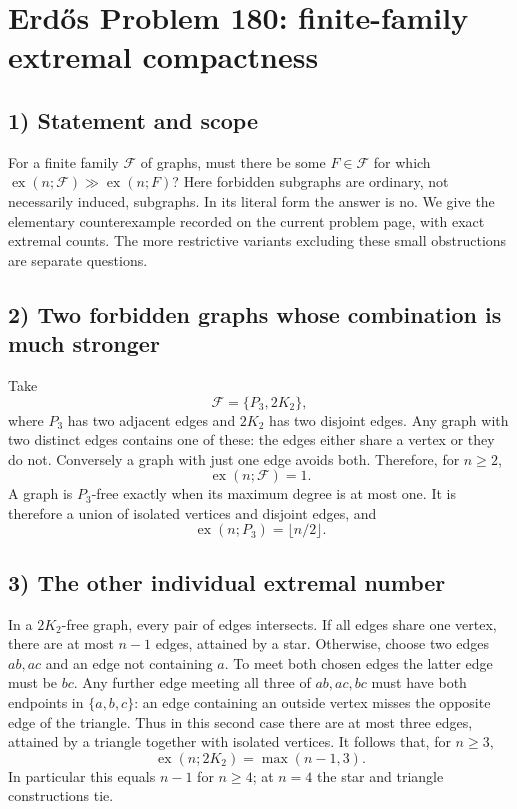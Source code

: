\section{Erd\H{o}s Problem 180: finite-family extremal compactness}

\subsection{1) Statement and scope}
For a finite family $\mathcal F$ of graphs, must there be some
$F\in\mathcal F$ for which
$\operatorname{ex}(n;\mathcal F)\gg\operatorname{ex}(n;F)$?
Here forbidden subgraphs are ordinary, not necessarily induced,
subgraphs. In its literal form the answer is no. We give the elementary
counterexample recorded on the current problem page, with exact
extremal counts. The more restrictive variants excluding these small
obstructions are separate questions.

\subsection{2) Two forbidden graphs whose combination is much stronger}
Take
\[
 \mathcal F=\{P_3,2K_2\},
\]
where $P_3$ has two adjacent edges and $2K_2$ has two disjoint edges.
Any graph with two distinct edges contains one of these: the edges
either share a vertex or they do not. Conversely a graph with just
one edge avoids both. Therefore, for $n\geq2$,
\[
 \operatorname{ex}(n;\mathcal F)=1.                    \tag{1}
\]
A graph is $P_3$-free exactly when its maximum degree is at most one.
It is therefore a union of isolated vertices and disjoint edges, and
\[
 \operatorname{ex}(n;P_3)=\lfloor n/2\rfloor.           \tag{2}
\]

\subsection{3) The other individual extremal number}
In a $2K_2$-free graph, every pair of edges intersects. If all edges
share one vertex, there are at most $n-1$ edges, attained by a star.
Otherwise, choose two edges $ab,ac$ and an edge not containing $a$.
To meet both chosen edges the latter edge must be $bc$.
Any further edge meeting all three of $ab,ac,bc$ must have both endpoints
in $\{a,b,c\}$: an edge containing an outside vertex misses the
opposite edge of the triangle. Thus in this second case there are at
most three edges, attained by a triangle together with isolated vertices.
It follows that, for $n\geq3$,
\[
 \operatorname{ex}(n;2K_2)=\max(n-1,3).                \tag{3}
\]
In particular this equals $n-1$ for $n\geq4$; at $n=4$ the star and
triangle constructions tie.

